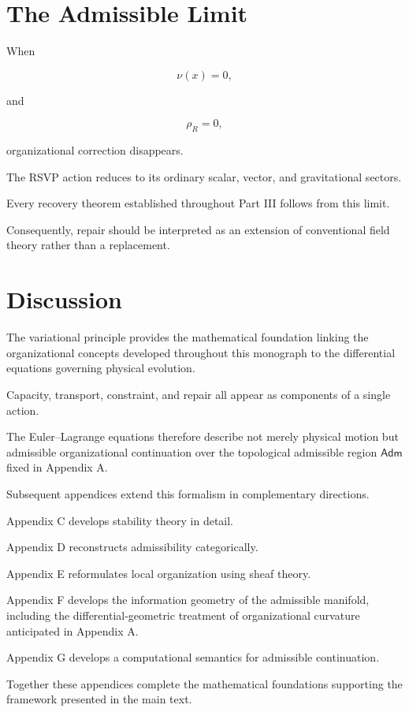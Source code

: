 \documentclass[11pt,oneside]{book}
\numberwithin{equation}{chapter}
\theoremstyle{definition}
\theoremstyle{plain}
\newcommand{\Adm}{\mathsf{Adm}}
\begin{document}
\section{The Admissible Limit}

When

\[
\nu(x)
=
0,
\]

and

\[
\rho_R
=
0,
\]

organizational correction disappears.

The RSVP action reduces to its ordinary scalar, vector, and gravitational
sectors.

Every recovery theorem established throughout Part III follows from this
limit.

Consequently, repair should be interpreted as an extension of conventional
field theory rather than a replacement.

\section{Discussion}

The variational principle provides the mathematical foundation linking the
organizational concepts developed throughout this monograph to the
differential equations governing physical evolution.

Capacity, transport, constraint, and repair all appear as components of a
single action.

The Euler--Lagrange equations therefore describe not merely physical
motion but admissible organizational continuation over the topological
admissible region \(\Adm\) fixed in Appendix A.

Subsequent appendices extend this formalism in complementary directions.

Appendix C develops stability theory in detail.

Appendix D reconstructs admissibility categorically.

Appendix E reformulates local organization using sheaf theory.

Appendix F develops the information geometry of the admissible manifold,
including the differential-geometric treatment of organizational
curvature anticipated in Appendix A.

Appendix G develops a computational semantics for admissible continuation.

Together these appendices complete the mathematical foundations
supporting the framework presented in the main text.
\end{document}
